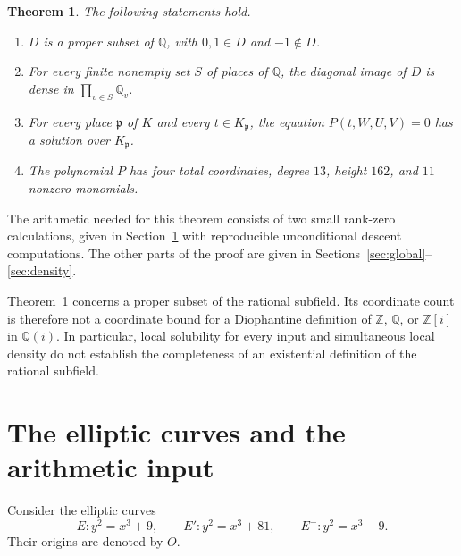 \documentclass[11pt,a4paper]{article}
\newtheorem{theorem}{Theorem}[section]
\theoremstyle{definition}
\newcommand{\Q}{\mathbb Q}\newcommand{\Z}{\mathbb Z}
\begin{document}
\begin{theorem}\label{thm:main}
The following statements hold.
\begin{enumerate}
\item $D$ is a proper subset of $\Q$, with $0,1\in D$ and $-1\notin D$.
\item For every finite nonempty set $S$ of places of $\Q$, the diagonal
image of $D$ is dense in $\prod_{v\in S}\Q_v$.
\item For every place $\mathfrak p$ of $K$ and every $t\in K_{\mathfrak p}$,
the equation $P(t,W,U,V)=0$ has a solution over $K_{\mathfrak p}$.
\item The polynomial $P$ has four total coordinates, degree $13$,
height $162$, and $11$ nonzero monomials.
\end{enumerate}
\end{theorem}

The arithmetic needed for this theorem consists of two small rank-zero
calculations, given in Section~\ref{sec:arithmetic} with reproducible
unconditional descent computations. The other parts of the proof are
given in Sections~\ref{sec:global}--\ref{sec:density}.

Theorem~\ref{thm:main} concerns a proper subset of the rational subfield.
Its coordinate count is therefore not a coordinate bound for a
Diophantine definition of $\Z$, $\Q$, or $\Z[i]$ in $\Q(i)$.
In particular, local solubility for every input and simultaneous
local density do not establish the completeness of an existential
definition of the rational subfield.

\section{The elliptic curves and the arithmetic input}\label{sec:arithmetic}

Consider the elliptic curves
\[
 E:y^2=x^3+9,\qquad
 E':y^2=x^3+81,\qquad
 E^-:y^2=x^3-9.
\]
Their origins are denoted by $O$.
\end{document}
